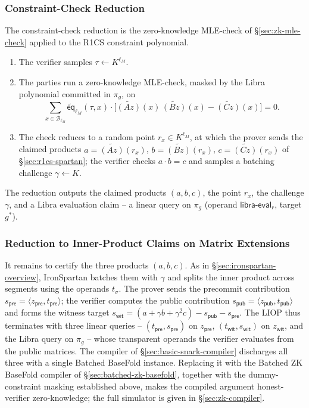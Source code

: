 \documentclass{article}
\theoremstyle{definition}
\newcommand*{\mle}{\widetilde}
\newcommand{\eq}{\mathsf{eq}}
\newcommand{\BB}{\mathcal{B}}
\begin{document}
\subsubsection{Constraint-Check Reduction}
\label{sec:constraint-check-reduction}

The constraint-check reduction is the zero-knowledge MLE-check of \S\ref{sec:zk-mle-check} applied to the R1CS constraint polynomial.
\begin{enumerate}
\item The verifier samples $\tau \gets K^{\ell_M}$.
\item The parties run a zero-knowledge MLE-check, masked by the Libra polynomial committed in $\pi_g$, on
\[
  \sum_{x \in \BB_{\ell_M}} \mle{\eq}_{\ell_M}(\tau, x) \cdot \bigl[ \mle{(Az)}(x)\, \mle{(Bz)}(x) - \mle{(Cz)}(x) \bigr] = 0.
\]
\item The check reduces to a random point $r_x \in K^{\ell_M}$, at which the prover sends the claimed products $a = \mle{(Az)}(r_x)$, $b = \mle{(Bz)}(r_x)$, $c = \mle{(Cz)}(r_x)$ of \S\ref{sec:r1cs-spartan}; the verifier checks $a \cdot b = c$ and samples a batching challenge $\gamma \gets K$.
\end{enumerate}
The reduction outputs the claimed products $(a, b, c)$, the point $r_x$, the challenge $\gamma$, and a Libra evaluation claim -- a linear query on $\pi_g$ (operand $\textsf{libra-eval}_r$, target $g^*$).

\subsubsection{Reduction to Inner-Product Claims on Matrix Extensions}
\label{sec:ip-reduction}

It remains to certify the three products $(a, b, c)$. As in \S\ref{sec:ironspartan-overview}, IronSpartan batches them with $\gamma$ and splits the inner product across segments using the operands $t_\sigma$. The prover sends the precommit contribution $s_{\textsf{pre}} = \langle z_{\textsf{pre}}, t_{\textsf{pre}} \rangle$; the verifier computes the public contribution $s_{\textsf{pub}} = \langle z_{\textsf{pub}}, t_{\textsf{pub}} \rangle$ and forms the witness target $s_{\textsf{wit}} = (a + \gamma b + \gamma^2 c) - s_{\textsf{pub}} - s_{\textsf{pre}}$. The LIOP thus terminates with three linear queries -- $(t_{\textsf{pre}}, s_{\textsf{pre}})$ on $z_{\textsf{pre}}$, $(t_{\textsf{wit}}, s_{\textsf{wit}})$ on $z_{\textsf{wit}}$, and the Libra query on $\pi_g$ -- whose transparent operands the verifier evaluates from the public matrices. The compiler of \S\ref{sec:basic-snark-compiler} discharges all three with a single Batched BaseFold instance. Replacing it with the Batched ZK BaseFold compiler of \S\ref{sec:batched-zk-basefold}, together with the dummy-constraint masking established above, makes the compiled argument honest-verifier zero-knowledge; the full simulator is given in \S\ref{sec:zk-compiler}.
\end{document}
